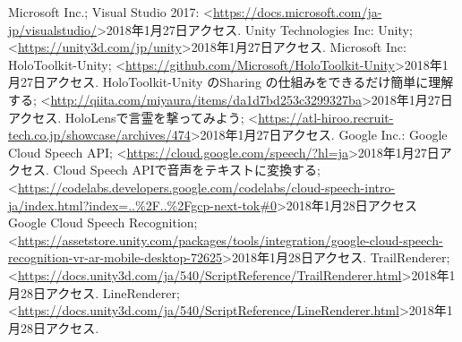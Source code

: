 \documentclass[11pt,a4j, titlepage]{jarticle} %
\begin{document}
\begin{thebibliography}{数字}
   Microsoft Inc.; Visual Studio 2017: \textless\url{https://docs.microsoft.com/ja-jp/visualstudio/}\textgreater2018年1月27日アクセス.
   Unity Technologies Inc: Unity;  \textless\url{https://unity3d.com/jp/unity}\textgreater2018年1月27日アクセス.
   Microsoft Inc: HoloToolkit-Unity; \textless\url{https://github.com/Microsoft/HoloToolkit-Unity}\textgreater2018年1月27日アクセス.
   HoloToolkit-Unity のSharing の仕組みをできるだけ簡単に理解する; \textless\url{http://qiita.com/miyaura/items/da1d7bd253c3299327ba}\textgreater2018年1月27日アクセス.
   HoloLensで言霊を撃ってみよう;  \textless\url{https://atl-hiroo.recruit-tech.co.jp/showcase/archives/474}\textgreater2018年1月27日アクセス.
   Google Inc.: Google Cloud Speech API; \textless\url{https://cloud.google.com/speech/?hl=ja}\textgreater2018年1月27日アクセス.
   Cloud Speech APIで音声をテキストに変換する; \textless\url{https://codelabs.developers.google.com/codelabs/cloud-speech-intro-ja/index.html?index=..\%2F..\%2Fgcp-next-tok\#0}\textgreater2018年1月28日アクセス
   Google Cloud Speech Recognition;  \textless\url{https://assetstore.unity.com/packages/tools/integration/google-cloud-speech-recognition-vr-ar-mobile-desktop-72625}\textgreater2018年1月28日アクセス.
   TrailRenderer; \textless\url{https://docs.unity3d.com/ja/540/ScriptReference/TrailRenderer.html}\textgreater2018年1月28日アクセス.
   LineRenderer; \textless\url{https://docs.unity3d.com/ja/540/ScriptReference/LineRenderer.html}\textgreater2018年1月28日アクセス.
\end{thebibliography}
\end{document}
